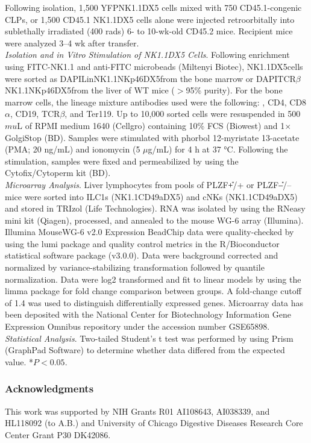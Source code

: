 Following isolation, 1,500 YFP\UP NK1.1\UP DX5\UM{} cells mixed with 750 CD45.1-congenic CLPs, or 1,500 CD45.1 NK1.1\UP DX5\UM{} cells alone were injected retroorbitally into sublethally irradiated (400 rads) 6- to 10-wk-old CD45.2 \Ragrg mice. Recipient mice were analyzed 3–4 wk after transfer.
\\
\textit{Isolation and in Vitro Stimulation of NK1.1\UP DX5\UM{} Cells}. Following enrichment using FITC-NK1.1 and anti-FITC microbeads (Miltenyi Biotec), NK1.1\UP DX5\UM cells were sorted as DAPI\UM Lin\UM NK1.1\UP NKp46\UP DX5\UM from the bone marrow or DAPI\UM \CDte\UM TCR$\beta$\UM NK1.1\UP NKp46\UP DX5\UM from the liver of WT mice ($>$95\% purity). For the bone marrow cells, the lineage mixture antibodies used were the following: \CDte, CD4, CD8$\alpha$, CD19, TCR$\beta$, and Ter119. Up to 10,000 sorted cells were resuspended in 500 $mu$L of RPMI medium 1640 (Cellgro) containing 10\% FCS (Biowest) and 1× GolgiStop (BD). Samples were stimulated with phorbol 12-myristate 13-acetate (PMA; 20 ng/mL) and ionomycin (5 $\mu$g/mL) for 4 h at 37 °C. Following the stimulation, samples were fixed and permeabilized by using the Cytofix/Cytoperm kit (BD).
\\
\textit{Microarray Analysis}. Liver lymphocytes from pools of PLZF\U{+/+} or PLZF\U{--/--} mice were sorted into ILC1s (\CDte\UM NK1.1\UP CD49a\UP DX5\UM) and cNKs (\CDte\UM NK1.1\UP CD49a\UM DX5\UP) and stored in TRIzol (Life Technologies). RNA was isolated by using the RNeasy mini kit (Qiagen), processed, and annealed to the mouse WG-6 array (Illumina). Illumina MouseWG-6 v2.0 Expression BeadChip data were quality-checked by using the lumi package \cite{du2008} and quality control metrics in the R/Bioconductor statistical software package (v3.0.0). Data were background corrected and normalized by variance-stabilizing transformation \cite{lin2008} followed by quantile normalization. Data were log2 transformed and fit to linear models by using the limma package \cite{smyth2005} for fold change comparison between groups. A fold-change cutoff of 1.4 was used to distinguish differentially expressed genes. Microarray data has been deposited with the National Center for Biotechnology Information Gene Expression Omnibus repository under the accession number GSE65898.
\\
\textit{Statistical Analysis}. Two-tailed Student’s t test was performed by using Prism (GraphPad Software) to determine whether data differed from the expected value. *$P < 0.05$.

\subsubsection{Acknowledgments}
This work was supported by NIH Grants R01 AI108643, AI038339, and HL118092 (to A.B.) and University of Chicago Digestive Diseases Research Core Center Grant P30 DK42086.

